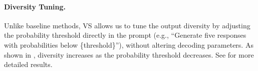 


\paragraph{Diversity Tuning.} Unlike baseline methods, VS allows us to tune the output diversity by adjusting the probability threshold directly in the prompt (e.g., ``Generate five responses with probabilities below \{threshold\}''), without altering decoding parameters. As shown in , diversity increases as the probability threshold decreases. See  for more detailed results.


